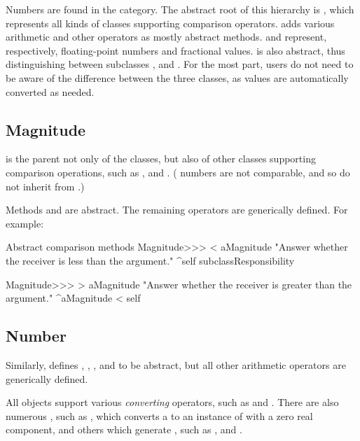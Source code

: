 \documentclass[a4paper,10pt,twoside]{book}
\begin{document}
Numbers are found in the  category.
The abstract root of this hierarchy is , which represents all kinds of classes supporting comparison operators.
 adds various arithmetic and other operators as mostly abstract methods.  and  represent, respectively, floating-point numbers and fractional values.
 is also abstract, thus distinguishing between subclasses ,  and .
For the most part, users do not need to be aware of the difference between the three  classes, as values are automatically converted as needed.

\subsection{Magnitude}

 is the parent not only of the  classes, but also of other classes supporting comparison operations, such as ,  and .
( numbers are not comparable, and so do not inherit from .)

Methods  and  are abstract.
The remaining operators are generically defined.
For example:

\begin{method}{Abstract comparison methods}
Magnitude>>> < aMagnitude 
    "Answer whether the receiver is less than the argument."
    ^self subclassResponsibility

Magnitude>>> > aMagnitude 
    "Answer whether the receiver is greater than the argument."
    ^aMagnitude < self
\end{method}

\subsection{Number}

Similarly,  defines , , , and  to be abstract, but all other arithmetic operators are generically defined.

All  objects support various \emph{converting} operators, such as  and .
There are also numerous , such as , which converts a  to an instance of  with a zero real component, and others which generate , such as ,  and .
\end{document}
